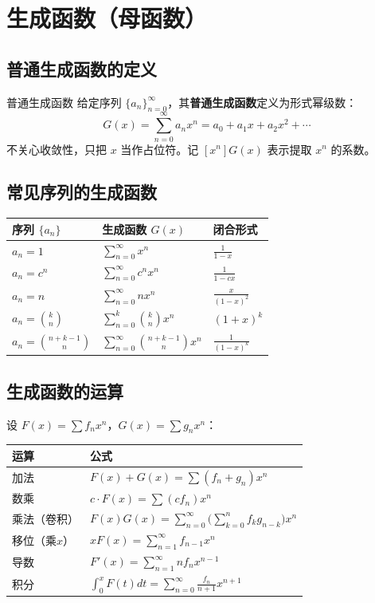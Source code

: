 \section{生成函数（母函数）}

\subsection{普通生成函数的定义}

\begin{mydefinition}{普通生成函数}
给定序列 \(\{a_n\}_{n=0}^{\infty}\)，其\textbf{普通生成函数}定义为形式幂级数：
\[
G(x) = \sum_{n=0}^{\infty} a_n x^n = a_0 + a_1 x + a_2 x^2 + \cdots
\]
不关心收敛性，只把 \(x\) 当作占位符。记 \([x^n]G(x)\) 表示提取 \(x^n\) 的系数。
\end{mydefinition}

\subsection{常见序列的生成函数}

\begin{table}[H]
\centering
\begin{tabular}{lll}
\toprule
序列 \(\{a_n\}\) & 生成函数 \(G(x)\) & 闭合形式 \\
\midrule
\(a_n = 1\) & \(\sum_{n=0}^{\infty} x^n\) & \(\frac{1}{1-x}\) \\
\(a_n = c^n\) & \(\sum_{n=0}^{\infty} c^n x^n\) & \(\frac{1}{1-cx}\) \\
\(a_n = n\) & \(\sum_{n=0}^{\infty} n x^n\) & \(\frac{x}{(1-x)^2}\) \\
\(a_n = \binom{k}{n}\) & \(\sum_{n=0}^{k} \binom{k}{n} x^n\) & \((1+x)^k\) \\
\(a_n = \binom{n+k-1}{n}\) & \(\sum_{n=0}^{\infty} \binom{n+k-1}{n} x^n\) & \(\frac{1}{(1-x)^k}\) \\
\bottomrule
\end{tabular}
\end{table}

\subsection{生成函数的运算}

设 \(F(x)=\sum f_n x^n\)，\(G(x)=\sum g_n x^n\)：

\begin{table}[H]
\centering
\begin{tabular}{ll}
\toprule
运算 & 公式 \\
\midrule
加法 & \(F(x)+G(x) = \sum (f_n+g_n)x^n\) \\
数乘 & \(c\cdot F(x) = \sum (c f_n)x^n\) \\
乘法{（卷积）} & \(F(x)G(x) = \sum_{n=0}^{\infty} \bigl(\sum_{k=0}^{n} f_k g_{n-k}\bigr) x^n\) \\
移位{（乘\(x\)）} & \(x F(x) = \sum_{n=1}^{\infty} f_{n-1} x^n\) \\
导数 & \(F'(x) = \sum_{n=1}^{\infty} n f_n x^{n-1}\) \\
积分 & \(\int_0^x F(t)dt = \sum_{n=0}^{\infty} \frac{f_n}{n+1} x^{n+1}\) \\
\bottomrule
\end{tabular}
\end{table}

